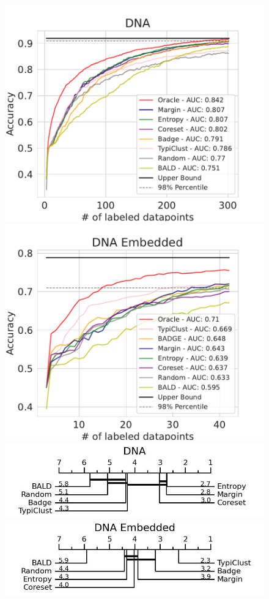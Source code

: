 \documentclass[]{article}
\begin{document}
\begin{figure}[H]
	\centering
	\includegraphics[width=0.49\linewidth]{img/eval_dna}
	\includegraphics[width=0.49\linewidth]{img/eval_dna_enc} \\ [2mm]
	\includegraphics[width=0.49\linewidth]{img/micro_dna.jpg}
	\includegraphics[width=0.49\linewidth]{img/micro_dna_enc.jpg} \\ [4mm]
\end{figure}
\end{document}
